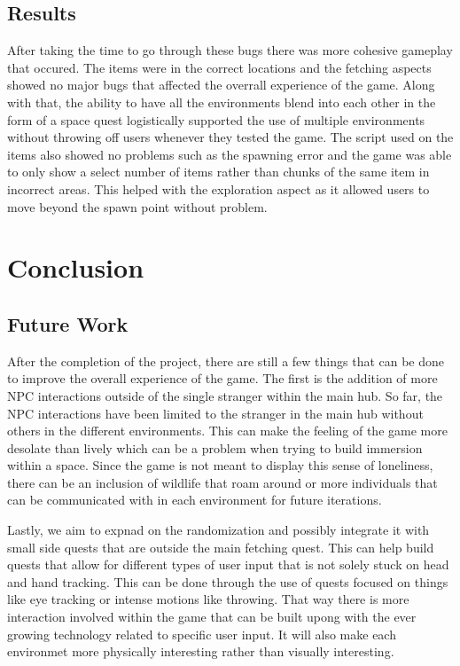 \documentclass{vgtc}                          %
\begin{document}
\subsection*{Results}

After taking the time to go through these bugs there was more cohesive gameplay that occured. The items were in the correct locations and the fetching aspects showed no major bugs that affected the overrall experience of the game. Along with that, the ability to have all the environments blend into each other in the form of a space quest logistically supported the use of multiple environments without
throwing off users whenever they tested the game. The script used on the items also showed no problems such as the spawning error and the game was able to only show a select number of items rather than chunks of the same item in incorrect areas. This helped with the exploration aspect as it allowed users to move beyond the spawn point without problem.

\section{Conclusion}
\subsection*{Future Work}
After the completion of the project, there are still a few things that can be done to improve the overall experience of the game. The first is the addition of more NPC interactions outside of the single stranger within the main hub. So far, the NPC interactions have been limited to the stranger in the main hub without others in the different environments. This can make the feeling of the game more desolate than lively
which can be a problem when trying to build immersion within a space. Since the game is not meant to display this sense of loneliness, there can be an inclusion of wildlife that roam around or more individuals that can be communicated with in each environment for future iterations.

Lastly, we aim to expnad on the randomization and possibly integrate it with small side quests that are outside the main fetching quest. This can help build quests that allow for different types of user input that is not solely stuck on head and hand tracking. This can be done through the use of quests focused on things like eye tracking or intense motions like throwing. That way there is more interaction involved within
the game that can be built upong with the ever growing technology related to specific user input. It will also make each environmet more physically interesting rather than visually interesting.


%

%
%
%


\end{document}
